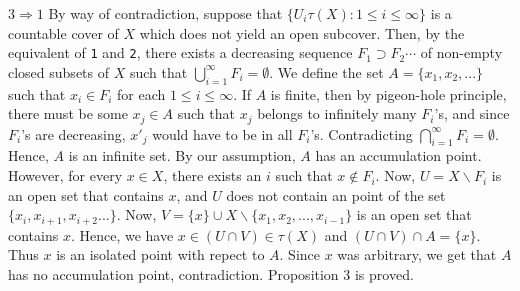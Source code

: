\documentclass{article}
\begin{document}
\texttt{$3\Rightarrow 1$} By way of contradiction, suppose that  $\{U_i\tau(X): 1\leq i\leq \infty\}$ is a countable cover of $X$ which does not yield an open subcover. Then, by the equivalent of \texttt{1} and \texttt{2}, there exists a decreasing sequence $F_1\supset F_2\cdots $ of non-empty closed subsets of $X$ such that $\bigcup_{i=1}^\infty F_i =\emptyset$. We define the set $A=\{x_1,x_2,...\}$ such that $x_i\in F_i$ for each $1\leq i\leq \infty$. If $A$ is finite, then by pigeon-hole principle, there must be some $x_j\in A$ such that $x_j$ belongs to infinitely many $F_i$'s, and since $F_i$'s are decreasing, $x'_j$ would have to be in all $F_i$'s. Contradicting $\bigcap_{i=1}^\infty F_i=\emptyset$. 
Hence, $A$ is an infinite set. By our assumption, $A$ has an accumulation point. 
However, for every $x\in X$, there exists an $i$ such that $x\notin F_i$. Now, $U=X\backslash F_i$ is an open set that contains $x$, and $U$ does not contain an point of the set $\{x_i,x_{i+1},x_{i+2}...\}$.   Now, $V=\{x\}\cup X\backslash \{x_1,x_2,...,x_{i-1}\}$ is an open set that contains $x$. Hence, we have $x\in (U\cap V) \in \tau(X)$ and $(U\cap V)\cap A=\{x\}$. Thus $x$ is an isolated point with repect to $A$. Since $x$ was arbitrary, we get that $A$ has no accumulation point, contradiction.  Proposition 3 is proved. 
\end{document}
